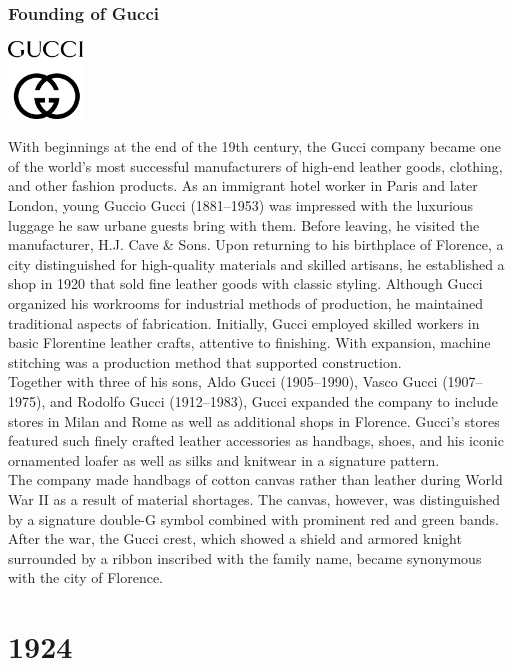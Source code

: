 \documentclass[11pt]{report}
\begin{document}
\subsection{Founding of Gucci}
\vspace{2mm}\begin{center}\includegraphics[width=2cm]{./img/gucciLogo.jpg}\end{center}
With beginnings at the end of the 19th century, the Gucci company became one of the world’s most successful manufacturers of high-end leather goods, clothing, and other fashion products. As an immigrant hotel worker in Paris and later London, young Guccio Gucci (1881–1953) was impressed with the luxurious luggage he saw urbane guests bring with them. Before leaving, he visited the manufacturer, H.J. Cave \& Sons. Upon returning to his birthplace of Florence, a city distinguished for high-quality materials and skilled artisans, he established a shop in 1920 that sold fine leather goods with classic styling. Although Gucci organized his workrooms for industrial methods of production, he maintained traditional aspects of fabrication. Initially, Gucci employed skilled workers in basic Florentine leather crafts, attentive to finishing. With expansion, machine stitching was a production method that supported construction.\\
\indent Together with three of his sons, Aldo Gucci (1905–1990), Vasco Gucci (1907–1975), and Rodolfo Gucci (1912–1983), Gucci expanded the company to include stores in Milan and Rome as well as additional shops in Florence. Gucci's stores featured such finely crafted leather accessories as handbags, shoes, and his iconic ornamented loafer as well as silks and knitwear in a signature pattern.\\
\indent The company made handbags of cotton canvas rather than leather during World War II as a result of material shortages. The canvas, however, was distinguished by a signature double-G symbol combined with prominent red and green bands. After the war, the Gucci crest, which showed a shield and armored knight surrounded by a ribbon inscribed with the family name, became synonymous with the city of Florence.

\chapter{1924}
\end{document}
